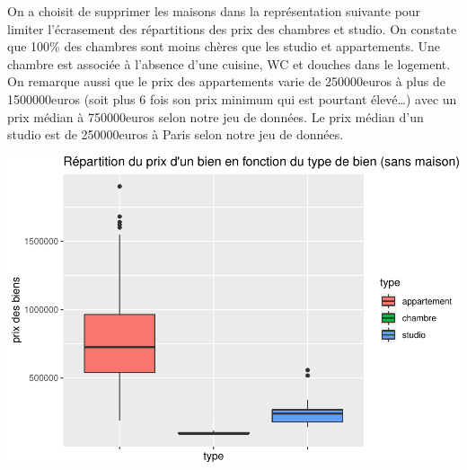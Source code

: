 \documentclass[french,]{article}
\newenvironment{Shaded}{\begin{snugshade}}{\end{snugshade}}
\newcommand{\CommentTok}[1]{\textcolor[rgb]{0.56,0.35,0.01}{\textit{#1}}}
\newcommand{\DataTypeTok}[1]{\textcolor[rgb]{0.13,0.29,0.53}{#1}}
\newcommand{\DecValTok}[1]{\textcolor[rgb]{0.00,0.00,0.81}{#1}}
\newcommand{\KeywordTok}[1]{\textcolor[rgb]{0.13,0.29,0.53}{\textbf{#1}}}
\newcommand{\NormalTok}[1]{#1}
\newcommand{\OperatorTok}[1]{\textcolor[rgb]{0.81,0.36,0.00}{\textbf{#1}}}
\newcommand{\StringTok}[1]{\textcolor[rgb]{0.31,0.60,0.02}{#1}}
\begin{document}
On a choisit de supprimer les maisons dans la représentation suivante
pour limiter l'écrasement des répartitions des prix des chambres et
studio. On constate que 100\% des chambres sont moins chères que les
studio et appartements. Une chambre est associée à l'absence d'une
cuisine, WC et douches dans le logement. On remarque aussi que le prix
des appartements varie de 250000euros à plus de 1500000euros (soit plus
6 fois son prix minimum qui est pourtant élevé\ldots{}) avec un prix
médian à 750000euros selon notre jeu de données. Le prix médian d'un
studio est de 250000euros à Paris selon notre jeu de données.

\begin{Shaded}
\end{Shaded}

\includegraphics{Projet_files/figure-latex/unnamed-chunk-26-1.pdf}
\end{document}

